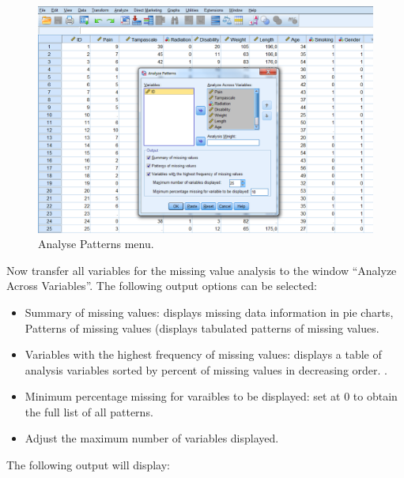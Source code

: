 \documentclass[]{book}
\providecommand{\tightlist}{%
  \setlength{\itemsep}{0pt}\setlength{\parskip}{0pt}}
\begin{document}
\begin{figure}

{\centering \includegraphics[width=0.9\linewidth]{images/fig2.5} 

}

\caption{Analyse Patterns menu.}\label{fig:fig2-5}
\end{figure}

Now transfer all variables for the missing value analysis to the window
``Analyze Across Variables''. The following output options can be
selected:

\begin{itemize}
\tightlist
\item
  Summary of missing values: displays missing data information in pie
  charts, Patterns of missing values (displays tabulated patterns of
  missing values.
\item
  Variables with the highest frequency of missing values: displays a
  table of analysis variables sorted by percent of missing values in
  decreasing order. .
\item
  Minimum percentage missing for varaibles to be displayed: set at 0 to
  obtain the full list of all patterns.
\item
  Adjust the maximum number of variables displayed.
\end{itemize}

The following output will display:
\end{document}
